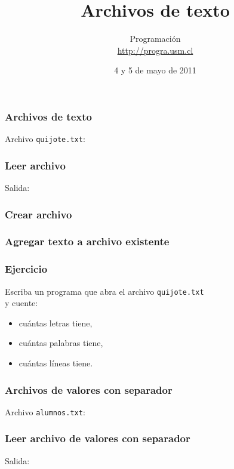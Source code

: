\documentclass[12pt]{beamer}
\title{Archivos de texto}
\author{
  Programación \\ \url{http://progra.usm.cl}
}
\date{4 y 5 de mayo de 2011}
\begin{document}
  \begin{frame}
    \maketitle
  \end{frame}

  \begin{frame}
    \label{archivo-texto}
    \frametitle{Archivos de texto}
    Archivo \texttt{quijote.txt}:
    
  \end{frame}

  \begin{frame}
    \label{leer-archivo-texto}
    \frametitle{Leer archivo}
    
    \vfill
    Salida:
    
  \end{frame}

  \begin{frame}
    \label{crear-archivo-texto}
    \frametitle{Crear archivo}
    
  \end{frame}

  \begin{frame}
    \label{agregar-a-archivo-texto}
    \frametitle{Agregar texto a archivo existente}
    
  \end{frame}

  \begin{frame}
    \label{ejercicio-archivos-texto}
    \frametitle{Ejercicio}
    Escriba un programa que abra el archivo \texttt{quijote.txt} \\ y cuente:
    \begin{itemize}
      \item cuántas letras tiene,
      \item cuántas palabras tiene,
      \item cuántas líneas tiene.
    \end{itemize}
  \end{frame}

  \begin{frame}
    \label{archivo-csv}
    \frametitle{Archivos de valores con separador}
    Archivo \texttt{alumnos.txt}:
    
  \end{frame}

  \begin{frame}
    \label{leer-archivo-csv}
    \frametitle{Leer archivo de valores con separador}
    
    \vfill
    Salida:
    
  \end{frame}
\end{document}
